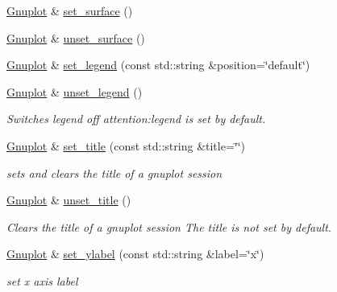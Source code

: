 \begin{DoxyCompactItemize}
\item 
\mbox{\hyperlink{class_gnuplot}{Gnuplot}} \& \mbox{\hyperlink{class_gnuplot_a9825bd26500e30ca88404c4807e6607a}{set\+\_\+surface}} ()
\item 
\mbox{\hyperlink{class_gnuplot}{Gnuplot}} \& \mbox{\hyperlink{class_gnuplot_a4ebddacbec61aa3e7bc4b89f508ad621}{unset\+\_\+surface}} ()
\item 
\mbox{\hyperlink{class_gnuplot}{Gnuplot}} \& \mbox{\hyperlink{class_gnuplot_ad64a717dac18167f656c4f09239973f8}{set\+\_\+legend}} (const std\+::string \&position=\char`\"{}default\char`\"{})
\item 
\mbox{\hyperlink{class_gnuplot}{Gnuplot}} \& \mbox{\hyperlink{class_gnuplot_ace901a18ab1a459213afd3ee0233b5ce}{unset\+\_\+legend}} ()
\begin{DoxyCompactList}\small\item\em Switches legend off attention\+:legend is set by default. \end{DoxyCompactList}\item 
\mbox{\hyperlink{class_gnuplot}{Gnuplot}} \& \mbox{\hyperlink{class_gnuplot_a4f93bac0e69dd83806652ca7226c6b3b}{set\+\_\+title}} (const std\+::string \&title=\char`\"{}\char`\"{})
\begin{DoxyCompactList}\small\item\em sets and clears the title of a gnuplot session \end{DoxyCompactList}\item 
\mbox{\hyperlink{class_gnuplot}{Gnuplot}} \& \mbox{\hyperlink{class_gnuplot_aca0aeb1dc0ac8d7e68ba6a15a977be28}{unset\+\_\+title}} ()
\begin{DoxyCompactList}\small\item\em Clears the title of a gnuplot session The title is not set by default. \end{DoxyCompactList}\item 
\mbox{\label{class_gnuplot_afcb311938827f8718f19ed52d66bad7c}} 
\mbox{\hyperlink{class_gnuplot}{Gnuplot}} \& \mbox{\hyperlink{class_gnuplot_afcb311938827f8718f19ed52d66bad7c}{set\+\_\+ylabel}} (const std\+::string \&label=\char`\"{}x\char`\"{})
\begin{DoxyCompactList}\small\item\em set x axis label \end{DoxyCompactList}\item 
\mbox{\label{class_gnuplot_aa93589a95aeab869ba731e2583843ae4}} 

\end{DoxyCompactItemize}
